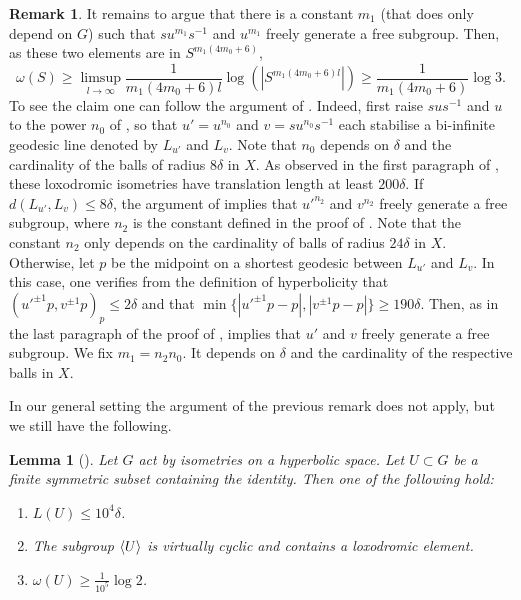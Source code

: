 \documentclass[leqno,a4paper,10pt]{amsart}
\theoremstyle{plain}
\newtheorem{lem}[thm]{Lemma}
\theoremstyle{definition}
\newtheorem{rem}[thm]{Remark}
\theoremstyle{remark}
\let\le\leqslant
\let\ge\geqslant
\newcommand{\group}[1]{
	\mathchoice%
	{\left\langle #1\right\rangle}%
	{\langle #1\rangle}%
	{\langle #1\rangle}%
	{\langle #1\rangle}%
}
\begin{document}
\begin{rem}
It remains to argue that there is a constant $m_1$ (that does only depend on $G$) such that $su^{m_1}s^{-1}$ and $u^{m_1}$ freely generate a free subgroup. Then, as these two elements are in $S^{m_1(4m_0+6)}$, 
$$\omega(S)\geqslant \limsup_{l\to \infty} \frac{1}{m_1(4m_0+6)l}\log(|S^{m_1(4m_0+6)l}|)\geqslant  \frac{1}{m_1(4m_0+6)} \log 3.$$ To see the claim one can follow the argument of \cite[Proposition 5.5]{koubi_croissance_1998}. Indeed, first raise $sus^{-1}$ and $u$ to the power $n_0$ of \cite[Lemma 5.3]{koubi_croissance_1998}, so that $u'=u^{n_0}$ and $v=su^{n_0}s^{-1}$ each stabilise a bi-infinite geodesic line denoted by $L_{u'}$ and $L_{v}$.  Note that $n_0$ depends on $\delta$ and the cardinality of the balls of radius $8\delta$ in $X$. As observed in the first paragraph of \cite[Proposition 5.5]{koubi_croissance_1998}, these loxodromic isometries have translation length at least $200\delta$.  If $d(L_{u'},L_v)\leqslant 8\delta$,  the argument of \cite[Proposition 5.5]{koubi_croissance_1998} implies that $u'^{n_2}$ and $v^{n_2}$ freely generate a free subgroup, where $n_2$ is the constant defined in the proof of \cite[Proposition 5.5]{koubi_croissance_1998} .  Note that the constant $n_2$ only depends on the cardinality of balls of radius $24\delta$ in $X$. Otherwise, let $p$ be the midpoint on a shortest geodesic between $L_{u'}$ and $L_v$. In this case, one verifies from the definition of hyperbolicity that $(u'^{\pm 1}p,v^{\pm 1}p)_p\leqslant 2\delta$ and that $\min\{|u'^{\pm 1}p-p|,|v^{\pm 1}p-p|\}\geqslant 190\delta$. Then, as in the last paragraph of the proof of \cite[Proposition 5.5]{koubi_croissance_1998}, \cite[Lemme 2.4]{koubi_croissance_1998} implies that $u'$ and $v$ freely generate a free subgroup. 
We fix $m_1=n_2n_0$. It depends on $\delta$ and the cardinality of the respective balls in $X$. 
\end{rem} 

In our general setting the argument of the previous remark does not apply, but we still have the following. 

\begin{lem}[]
	\label{lem:breuillard-fujiwara}
	Let $G$ act by isometries on a hyperbolic space. Let $U\subset G$ be a finite symmetric subset containing the identity. Then one of the following hold:
\begin{enumerate}
	\item $L(U)\le 10^4 \delta$. 
	\item The subgroup $\group{U}$ is virtually cyclic and contains a loxodromic element.
	\item $\omega(U) \ge \frac{1}{10^5} \log 2$.
\end{enumerate}
\end{lem}
\end{document}
